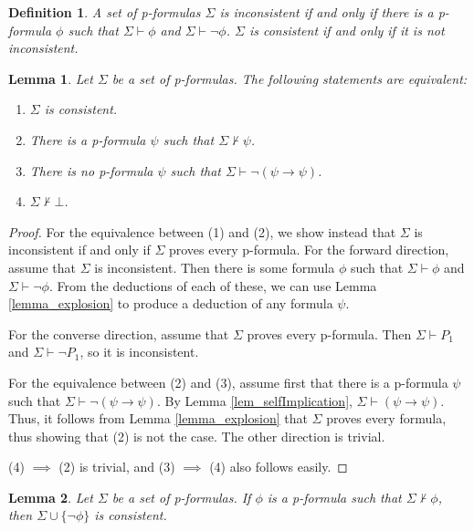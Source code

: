 \documentclass[leqno]{article}
\newtheorem{lemma}{Lemma}[section]
\newtheorem{definition}{Definition}[section]
\newcommand{\set}[1]{\{#1\}}
\newcommand{\proves}{\vdash}
\newcommand{\nproves}{\nvdash}
\newcommand{\limplies}{\rightarrow}
\begin{document}
\begin{definition}
    A set of p-formulas $\Sigma$ is inconsistent if and only if there is a p-formula $\phi$ such that $\Sigma \proves \phi$ and $\Sigma \proves \neg \phi$. $\Sigma$ is consistent if and only if it is not inconsistent.
\end{definition}

\begin{lemma} \label{lem_consistencyEquiv}
    Let $\Sigma$ be a set of p-formulas. The following statements are equivalent:
    \begin{enumerate}
        \item $\Sigma$ is consistent.
        \item There is a p-formula $\psi$ such that $\Sigma \nproves \psi$.
        \item There is no p-formula $\psi$ such that $\Sigma \proves \neg (\psi \limplies \psi)$.
        \item $\Sigma \nproves \bot$.
    \end{enumerate}
\end{lemma}

\begin{proof}
      For the equivalence between (1) and (2), we show instead that $\Sigma$ is inconsistent if and only if $\Sigma$ proves every p-formula. For the forward direction, assume that $\Sigma$ is inconsistent. Then there is some formula $\phi$ such that $\Sigma \proves \phi$ and $\Sigma \proves \neg \phi$. From the deductions of each of these, we can use Lemma \ref{lemma_explosion} to produce a deduction of any formula $\psi$.
     
     For the converse direction, assume that $\Sigma$ proves every p-formula. Then $\Sigma \proves P_1$ and $\Sigma \proves \neg P_1$, so it is inconsistent.
     
     For the equivalence between (2) and (3), assume first that there is a p-formula $\psi$ such that $\Sigma \proves \neg(\psi \limplies \psi)$. By Lemma \ref{lem_selfImplication}, $\Sigma \proves (\psi \limplies \psi)$. Thus, it follows from Lemma \ref{lemma_explosion} that $\Sigma$ proves every formula, thus showing that (2) is not the case. The other direction is trivial.
     
     (4) $\implies$ (2) is trivial, and (3) $\implies$ (4) also follows easily.
 \end{proof}
 
 \begin{lemma} \label{lem_addStaysConsistent}
     Let $\Sigma$ be a set of p-formulas. If $\phi$ is a p-formula such that $\Sigma \nproves \phi$, then $\Sigma \cup \set{\neg \phi}$ is consistent.
 \end{lemma}
 
\end{document}
